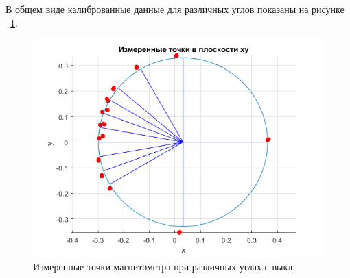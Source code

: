 \documentclass[a4paper,12pt]{article}
\begin{document}
В общем виде калиброванные данные для различных углов показаны на рисунке ~\ref{fig:round_circle}.
\begin{figure}[htb] %
\centering
\includegraphics[width=1\textwidth]{PICS/measdots.png} %
\caption{\label{fig:round_circle} Измеренные точки магнитометра при различных углах с выкл.} %
\end{figure}


\end{document}
